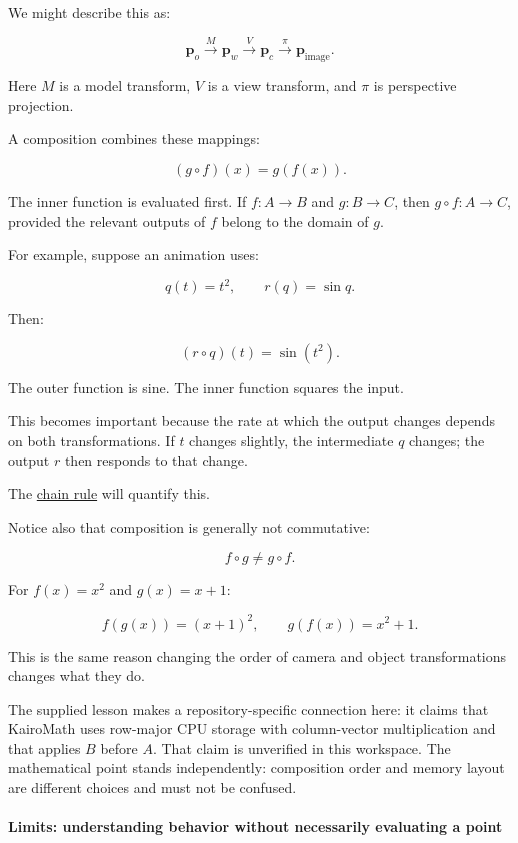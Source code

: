 We might describe this as:

\[
\mathbf p_o \xrightarrow{M} \mathbf p_w \xrightarrow{V} \mathbf p_c \xrightarrow{\pi} \mathbf p_{\text{image}}.
\]

Here \(M\) is a model transform, \(V\) is a view transform, and \(\pi\) is perspective projection.

A composition combines these mappings:

\[
(g\circ f)(x)=g(f(x)).
\]

The inner function is evaluated first. If \(f:A\to B\) and \(g:B\to C\), then \(g\circ f:A\to C\), provided the relevant outputs of \(f\) belong to the domain of \(g\).

For example, suppose an animation uses:

\[
q(t)=t^2,\qquad r(q)=\sin q.
\]

Then:

\[
(r\circ q)(t)=\sin(t^2).
\]

The outer function is sine. The inner function squares the input.

This becomes important because the rate at which the output changes depends on both transformations. If \(t\) changes slightly, the intermediate \(q\) changes; the output \(r\) then responds to that change.

The \hyperref[01-foundations-i-ch020-functions-limits-continuity-and-scalar-change]{chain rule} will quantify this.

Notice also that composition is generally not commutative:

\[
f\circ g\ne g\circ f.
\]

For \(f(x)=x^2\) and \(g(x)=x+1\):

\[
f(g(x))=(x+1)^2, \qquad g(f(x))=x^2+1.
\]

This is the same reason changing the order of camera and object transformations changes what they do.

The supplied lesson makes a repository-specific connection here: it claims that KairoMath uses row-major CPU storage with column-vector multiplication and that  applies \(B\) before \(A\). That claim is unverified in this workspace. The mathematical point stands independently: composition order and memory layout are different choices and must not be confused.

\paragraph{Limits: understanding behavior without necessarily evaluating a point}\label{01-foundations-i-ch020-limits-understanding-behavior-without-necessarily-evaluating-a-point}

